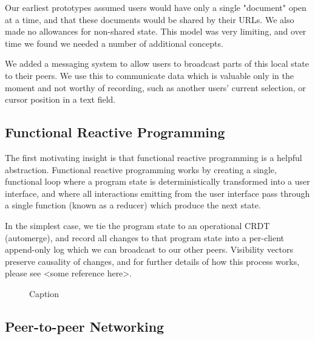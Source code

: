 \documentclass[sigplan,10pt]{acmart}
\begin{document}


Our earliest prototypes assumed users would have only a single "document" open at a time, and that these documents would be shared by their URLs. We also made no allowances for non-shared state. This model was very limiting, and over time we found we needed a number of additional concepts.

We added a messaging system to allow users to broadcast parts of this local state to their peers. We use this to communicate data which is valuable only in the moment and not worthy of recording, such as another users' current selection, or cursor position in a text field.



\subsection{Functional Reactive Programming}
The first motivating insight is that functional reactive programming is a helpful abstraction. Functional reactive programming works by creating a single, functional loop where a program state is deterministically transformed into a user interface, and where all interactions emitting from the user interface pass through a single function (known as a reducer) which produce the next state.

In the simplest case, we tie the program state to an operational CRDT (automerge), and record all changes to that program state into a per-client append-only log which we can broadcast to our other peers. Visibility vectors preserve causality of changes, and for further details of how this process works, please see <some reference here>.

\begin{figure}
    \centering
    \caption{Caption}
    \label{fig:my_label}
\end{figure}

\subsection{Peer-to-peer Networking}
\end{document}
